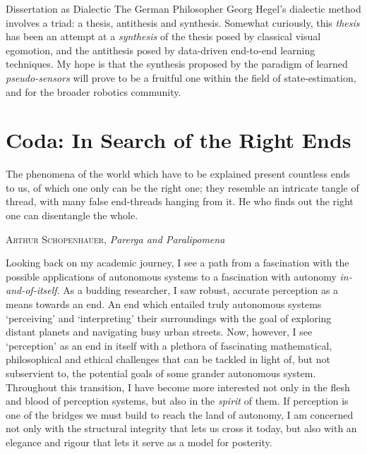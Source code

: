 \begin{remark}{Dissertation as Dialectic}
The German Philosopher Georg Hegel's dialectic method involves a triad: a thesis, antithesis and synthesis.
Somewhat curiously, this \textit{thesis} has been an attempt at a \textit{synthesis} of the thesis posed by classical visual egomotion, and the antithesis posed by data-driven end-to-end learning techniques.
My hope is that the synthesis proposed by the paradigm of learned \textit{pseudo-sensors} will prove to be a fruitful one within the field of state-estimation, and for the broader robotics community. 
\end{remark}
\newpage
\section{Coda: In Search of the Right Ends}
\epigraph{The phenomena of the world which have to be explained present countless ends to us, of which one only can be the right one; they resemble an intricate tangle of thread, with many false end-threads hanging from it. He who finds out the right one can disentangle the whole.}{\textsc{Arthur Schopenhauer}, \textit{Parerga and Paralipomena}}


Looking back on my academic journey, I see a path from a fascination with the possible applications of autonomous systems to a fascination with autonomy \textit{in-and-of-itself}. As a budding researcher, I saw robust, accurate perception as a means towards an end. An end which entailed truly autonomous systems `perceiving' and `interpreting' their surroundings with the goal of exploring distant planets and navigating busy urban streets. Now, however, I see `perception' as an end in itself with a plethora of fascinating mathematical, philosophical and ethical challenges that can be tackled in light of, but not subservient to, the potential goals of some grander autonomous system. Throughout this transition, I have become more interested not only in the flesh and blood of perception systems, but also in the \textit{spirit} of them. If perception is one of the bridges we must build to reach the land of autonomy, I am concerned not only with the structural integrity that lets us cross it today, but also with an elegance and rigour that lets it serve as a model for posterity. 

